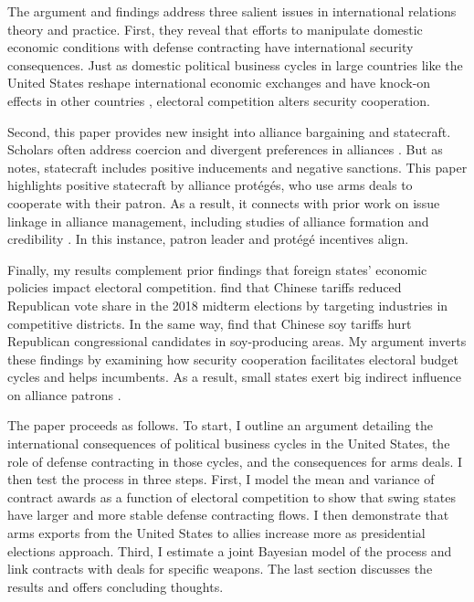 \documentclass[12pt]{article}
\begin{document}
The argument and findings address three salient issues in international relations theory and practice. 
First, they reveal that efforts to manipulate domestic economic conditions with defense contracting have international security consequences. 
Just as domestic political business cycles in large countries like the United States reshape international economic exchanges and have knock-on effects in other countries \citep{Kayser2006, Kayser2009}, electoral competition alters security cooperation. 


Second, this paper provides new insight into alliance bargaining and statecraft. 
Scholars often address coercion and divergent preferences in alliances \citep{Oatley2015, Beckeretal2023}. %
But as \citet{Baldwin2020} notes, statecraft includes positive inducements and negative sanctions. 
This paper highlights positive statecraft by alliance prot{\'e}g{\'e}s, who use arms deals to cooperate with their patron.
As a result, it connects with prior work on issue linkage in alliance management, including studies of alliance formation \citep{Poast2012} and credibility \citep{Davis2008, Poast2013}.
In this instance, patron leader and prot{\'e}g{\'e} incentives align.


Finally, my results complement prior findings that foreign states' economic policies impact electoral competition. 
\citet{KimMargalit2021} find that Chinese tariffs reduced Republican vote share in the 2018 midterm elections by targeting industries in competitive districts.
In the same way, \citet{ChyzhUrbatsch2021} find that Chinese soy tariffs hurt Republican congressional candidates in soy-producing areas. 
My argument inverts these findings by examining how security cooperation facilitates electoral budget cycles and helps incumbents. 
As a result, small states exert big indirect influence on alliance patrons \citep{Keohane1971}.


The paper proceeds as follows. 
To start, I outline an argument detailing the international consequences of political business cycles in the United States, the role of defense contracting in those cycles, and the consequences for arms deals. 
I then test the process in three steps. 
First, I model the mean and variance of contract awards as a function of electoral competition to show that swing states have larger and more stable defense contracting flows. 
I then demonstrate that arms exports from the United States to allies increase more as presidential elections approach.
Third, I estimate a joint Bayesian model of the process and link contracts with deals for specific weapons.
The last section discusses the results and offers concluding thoughts.
\end{document}
